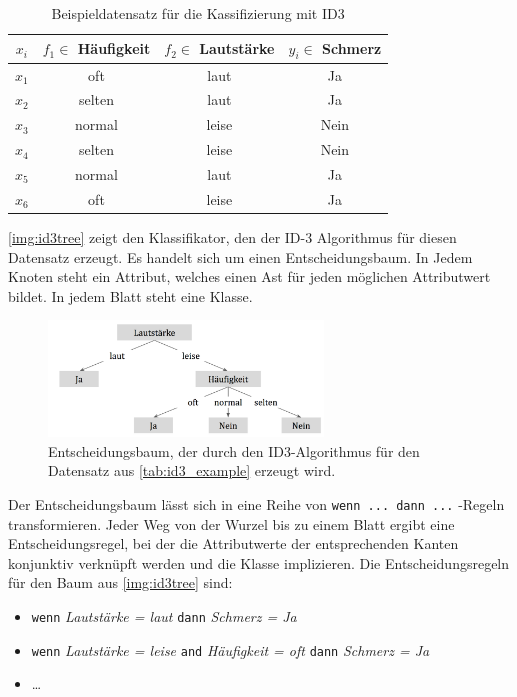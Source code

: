 \begin{table}[h]
	\centering
	\caption{Beispieldatensatz für die Kassifizierung mit ID3}
	\label{tab:id3_example}
	\begin{tabular}{cccc}
		\toprule
		$x_i$    & $f_1 \in $ Häufigkeit   & $f_2 \in $ Lautstärke & $y_i \in $ Schmerz \\\midrule
		$x_1$  & oft                & laut          & Ja           \\
		$x_2$  & selten                & laut          & Ja           \\
		$x_3$  & normal                & leise          & Nein         \\
		$x_4$  & selten                & leise          & Nein           \\
		$x_5$  & normal                & laut         & Ja       \\
		$x_6$  & oft                & leise          & Ja       \\ \bottomrule  
	\end{tabular}
\end{table}

\autoref{img:id3tree} zeigt den Klassifikator, den der ID-3 Algorithmus für diesen Datensatz erzeugt. Es handelt sich um einen Entscheidungsbaum. In Jedem Knoten steht ein Attribut, welches einen Ast für jeden möglichen Attributwert bildet. In jedem Blatt steht eine Klasse.\cite[S. 134]{machine_marsland}

\begin{figure}[h]
	\centering
	\includegraphics[width=0.65\textwidth]{bilder/id3tree02.png}
	\caption[Beispiel für einen Entscheidungsbaum]{Entscheidungsbaum, der durch den ID3-Algorithmus für den Datensatz aus \autoref{tab:id3_example} erzeugt wird.}
	\label{img:id3tree}
\end{figure}

Der Entscheidungsbaum lässt sich in eine Reihe von \texttt{wenn ... dann ...} -Regeln transformieren. Jeder Weg von der Wurzel bis zu einem Blatt ergibt eine Entscheidungsregel, bei der die Attributwerte der entsprechenden Kanten konjunktiv verknüpft werden und die Klasse implizieren.\cite[S. 134]{machine_marsland} Die Entscheidungsregeln für den Baum aus \autoref{img:id3tree} sind:
\begin{itemize}
	\item \texttt{wenn}  \emph{Lautstärke = laut} \texttt{dann} \emph{Schmerz = Ja}
	\item \texttt{wenn}  \emph{Lautstärke = leise} \texttt{and} \emph{Häufigkeit = oft} \texttt{dann} \emph{Schmerz = Ja}
	\item \ldots
\end{itemize}

